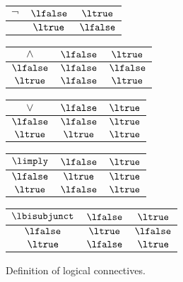         \begin{figure}[b]
            \centering
            \begin{tabular}{c|cc}
                $\lnot$ & $\lfalse$ & $\ltrue$ \\ \hline
                 & $\ltrue$ & $\lfalse$
            \end{tabular}
            \vspace{1em}
            \hspace{2em}
            \begin{tabular}{c|cc}
                $\land$ & $\lfalse$ & $\ltrue$ \\ \hline
                $\lfalse$ & $\lfalse$ & $\lfalse$ \\
                $\ltrue$ & $\lfalse$ & $\ltrue$
            \end{tabular}
            \hspace{2em}
            \begin{tabular}{c|cc}
                $\lor$ & $\lfalse$ & $\ltrue$ \\ \hline
                $\lfalse$ & $\lfalse$ & $\ltrue$ \\
                $\ltrue$ & $\ltrue$ & $\ltrue$
            \end{tabular}
            \hspace{2em}
            \begin{tabular}{c|cc}
                $\limply$ & $\lfalse$ & $\ltrue$ \\ \hline
                $\lfalse$ & $\ltrue$ & $\ltrue$ \\
                $\ltrue$ & $\lfalse$ & $\ltrue$
            \end{tabular}
            \hspace{2em}
            \begin{tabular}{c|cc}
                $\lbisubjunct$ & $\lfalse$ & $\ltrue$ \\ \hline
                $\lfalse$ & $\ltrue$ & $\lfalse$ \\
                $\ltrue$ & $\lfalse$ & $\ltrue$
            \end{tabular}
            \caption{Definition of logical connectives.}
            \label{fig:logical-connectives}
        \end{figure}




